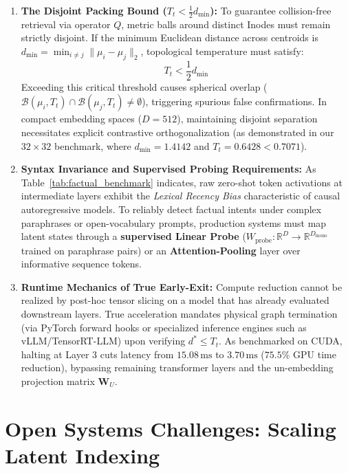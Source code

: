 \documentclass[11pt,a4paper]{article}
\theoremstyle{definition}
\begin{document}
\begin{enumerate}[leftmargin=*, itemsep=2.0pt]
    \item \textbf{The Disjoint Packing Bound ($T_t < \frac{1}{2} d_{\min}$):} To guarantee collision-free retrieval via operator $Q$, metric balls around distinct Inodes must remain strictly disjoint. If the minimum Euclidean distance across centroids is $d_{\min} = \min_{i \ne j} \|\mu_i - \mu_j\|_2$, topological temperature must satisfy:
    \begin{equation}
        T_t < \frac{1}{2} d_{\min}
    \end{equation}
    Exceeding this critical threshold causes spherical overlap ($\mathcal{B}(\mu_i, T_t) \cap \mathcal{B}(\mu_j, T_t) \ne \emptyset$), triggering spurious false confirmations. In compact embedding spaces ($D=512$), maintaining disjoint separation necessitates explicit contrastive orthogonalization (as demonstrated in our $32 \times 32$ benchmark, where $d_{\min} = 1.4142$ and $T_t = 0.6428 < 0.7071$).
    \item \textbf{Syntax Invariance and Supervised Probing Requirements:} As Table~\ref{tab:factual_benchmark} indicates, raw zero-shot token activations at intermediate layers exhibit the \textit{Lexical Recency Bias} characteristic of causal autoregressive models. To reliably detect factual intents under complex paraphrases or open-vocabulary prompts, production systems must map latent states through a \textbf{supervised Linear Probe} ($W_{\mathrm{probe}}: \mathbb{R}^D \to \mathbb{R}^{D_{\mathrm{mono}}}$ trained on paraphrase pairs) or an \textbf{Attention-Pooling} layer over informative sequence tokens.
    \item \textbf{Runtime Mechanics of True Early-Exit:} Compute reduction cannot be realized by post-hoc tensor slicing on a model that has already evaluated downstream layers. True acceleration mandates physical graph termination (via PyTorch forward hooks or specialized inference engines such as vLLM/TensorRT-LLM) upon verifying $d^* \le T_t$. As benchmarked on CUDA, halting at Layer 3 cuts latency from $15.08\,\text{ms}$ to $3.70\,\text{ms}$ ($75.5\%$ GPU time reduction), bypassing remaining transformer layers and the un-embedding projection matrix $\mathbf{W}_U$.
\end{enumerate}

\section{Open Systems Challenges: Scaling Latent Indexing}
\end{document}
